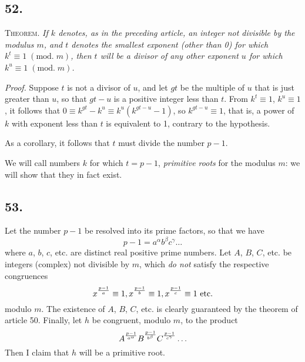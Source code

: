 \documentclass[twoside,12pt]{memoir}
\renewcommand{\pmod}[1]{\;(\textrm{mod.}\;#1)}
\let\oldfrac\frac
\def\frac#1#2{\mathchoice{\tfrac{#1}{#2}}{\oldfrac{#1}{#2}}{\genfrac{}{}{}{2}{#1}{#2\mathstrut}}{\genfrac{}{}{}{3}{#1}{#2\mathstrut}}}
\begin{document}
\subsection*{52.}

\textsc{Theorem.} \textit{If \(k\) denotes, as in the preceding article, an integer not divisible by the modulus \(m\), and \(t\) denotes the smallest exponent (other than 0) for which \(k^{t} \equiv 1\pmod{m}\), then \(t\) will be a divisor of any other exponent \(u\) for which \(k^{u} \equiv 1\pmod{m}\).}\pagebreak%

\textit{Proof.} Suppose \(t\) is not a divisor of \(u\), and let \(g t\) be the multiple of \(u\) that is just greater than \(u\), so that \(g t-u\) is a positive integer less than \(t\). From \(k^{t} \equiv 1\), \(k^{u} \equiv 1\), it follows that \(0 \equiv k^{g t}-k^{u} \equiv k^{u}(k^{g t-u}-1)\), so \(k^{g t-u} \equiv 1\), that is, a power of \(k\) with exponent less than \(t\) is equivalent to 1, contrary to the hypothesis.

As a corollary, it follows that \(t\) must divide the number \(p-1\).

We will call numbers \(k\) for which \(t=p-1\), \textit{primitive roots} for the modulus \(m\): we will show that they in fact exist.

\subsection*{53.}

Let the number \(p-1\) be resolved into its prime factors, so that we have
\[p-1=a^{\alpha} b^{\beta} c^{\gamma} \ldots\]
where \(a\), \(b\), \(c\), etc{.} are distinct real positive prime numbers. Let \(A\), \(B\), \(C\), etc{.} be integers (complex) not divisible by \(m\), which \textit{do not} satisfy the respective congruences
\[x^{\frac{p-1}{a}} \equiv 1, x^{\frac{p-1}{b}} \equiv 1, x^{\frac{p-1}{c}} \equiv 1 \text{ etc{.}}\]
modulo \(m\).  The existence of \(A\), \(B\), \(C\), etc{.} is clearly guaranteed by the theorem of article 50. Finally, let \(h\) be congruent, modulo \(m\), to the product
\[A^{\frac{p-1}{a^{\alpha}}} B^{\frac{p-1}{b^{\beta}}} C^{\frac{p-1}{c^{\gamma}}} \ldots\]
Then I claim that \(h\) will be a primitive root.
\end{document}
